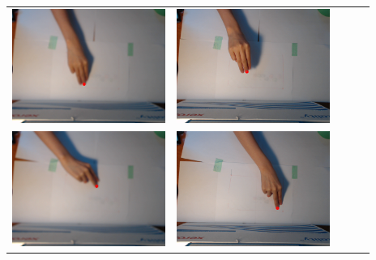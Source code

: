 \begin{tabular}{lllll}
\includegraphics[width=5cm]{fig3/im2_149.png} &
\includegraphics[width=5cm]{fig3/im2_162.png} \\
\includegraphics[width=5cm]{fig3/im3_78.png} &
\includegraphics[width=5cm]{fig3/im3_109.png} \\
\end{tabular}
